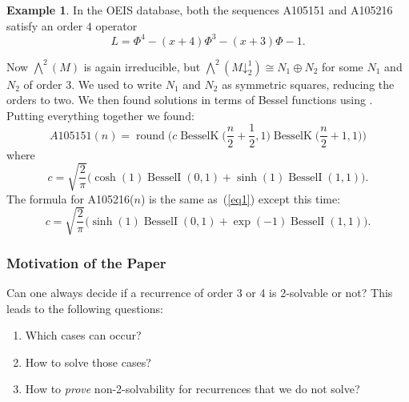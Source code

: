 \documentclass[11pt,reqno]{amsart}
\theoremstyle{definition}
\newtheorem{example}[theorem]{Example}
\DeclareMathOperator{\round}{round}
\DeclareMathOperator{\BesselK}{BesselK}
\DeclareMathOperator{\BesselI}{BesselI}
\newcommand{\pda}{\mathord{\downarrow}}
\begin{document}
\begin{example} In the OEIS database, both the sequences A105151 and A105216 satisfy an order $4$ operator $$L=\Phi^4-(x+4)\Phi^3-(x+3)\Phi-1.$$ 

Now $\bigwedge^2(M)$ is again irreducible, but $\bigwedge^2(M \pda_{2}^{1}) \cong N_1 \oplus N_2$ for some $N_1$ and $N_2$ of order $3$. We used \cite{bou2024solving} to write $N_1$ and $N_2$ as symmetric squares, reducing the orders to two. We then found solutions in terms of Bessel functions using \cite{cha2010solving}. Putting everything together we found: \begin{equation} \label{eq1} A105151(n) = \round\Bigg(c\BesselK\Big(\frac{n}{2}+\frac{1}{2},1\Big)\BesselK\Big(\frac{n}{2}+1,1\Big)\Bigg)\end{equation}
%
%
where
   $$c = \sqrt{\frac{2}{\pi}}\Bigg(\cosh(1)\BesselI(0,1) + \sinh(1)\BesselI(1,1)\Bigg).$$
The formula for A105216($n$) is the same as~(\ref{eq1}) except this time:
	$$c = \sqrt{\frac{2}{\pi}}\Bigg(\sinh(1)\BesselI(0,1)+\exp(-1)\BesselI(1,1)\Bigg).$$ 

\end{example}

\subsubsection{Motivation of the Paper}

Can one always decide if a recurrence of order 3 or 4 is 2-solvable or not?
This leads to the following questions:

\begin{enumerate} 
\item Which cases can occur? 

\item How to solve those cases? 

\item How to {\em prove} non-2-solvability for recurrences that we do not solve?\end{enumerate}
\end{document}
